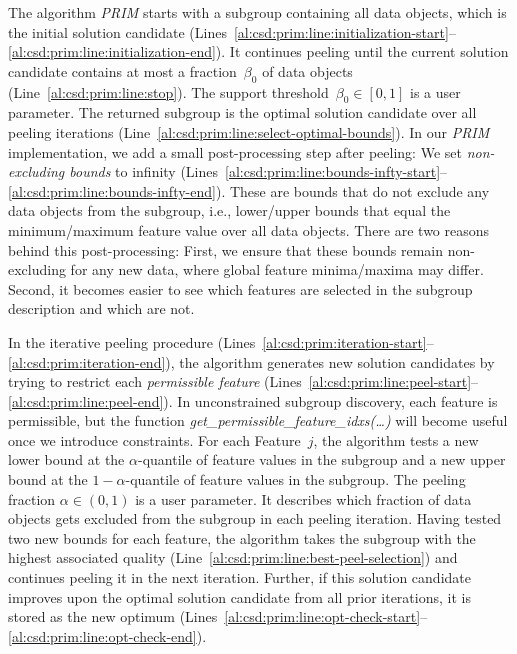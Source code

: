 \documentclass{article}
\theoremstyle{definition}
\begin{document}
The algorithm \emph{PRIM} starts with a subgroup containing all data objects, which is the initial solution candidate (Lines~\ref{al:csd:prim:line:initialization-start}--\ref{al:csd:prim:line:initialization-end}).
It continues peeling until the current solution candidate contains at most a fraction~$\beta_0$ of data objects (Line~\ref{al:csd:prim:line:stop}).
The support threshold~$\beta_0 \in [0, 1]$ is a user parameter.
The returned subgroup is the optimal solution candidate over all peeling iterations (Line~\ref{al:csd:prim:line:select-optimal-bounds}).
In our \emph{PRIM} implementation, we add a small post-processing step after peeling:
We set \emph{non-excluding bounds} to infinity (Lines~\ref{al:csd:prim:line:bounds-infty-start}--\ref{al:csd:prim:line:bounds-infty-end}).
These are bounds that do not exclude any data objects from the subgroup, i.e., lower/upper bounds that equal the minimum/maximum feature value over all data objects.
There are two reasons behind this post-processing:
First, we ensure that these bounds remain non-excluding for any new data, where global feature minima/maxima may differ.
Second, it becomes easier to see which features are selected in the subgroup description and which are not.

In the iterative peeling procedure (Lines~\ref{al:csd:prim:iteration-start}--\ref{al:csd:prim:iteration-end}), the algorithm generates new solution candidates by trying to restrict each \emph{permissible feature} (Lines~\ref{al:csd:prim:line:peel-start}--\ref{al:csd:prim:line:peel-end}).
In unconstrained subgroup discovery, each feature is permissible, but the function \emph{get\_permissible\_feature\_idxs(\dots)} will become useful once we introduce constraints.
For each Feature~$j$, the algorithm tests a new lower bound at the $\alpha$-quantile of feature values in the subgroup and a new upper bound at the $1-\alpha$-quantile of feature values in the subgroup.
The peeling fraction $\alpha \in (0, 1)$ is a user parameter.
It describes which fraction of data objects gets excluded from the subgroup in each peeling iteration.
Having tested two new bounds for each feature, the algorithm takes the subgroup with the highest associated quality (Line~\ref{al:csd:prim:line:best-peel-selection}) and continues peeling it in the next iteration. Further, if this solution candidate improves upon the optimal solution candidate from all prior iterations, it is stored as the new optimum (Lines~\ref{al:csd:prim:line:opt-check-start}--\ref{al:csd:prim:line:opt-check-end}).
\end{document}
